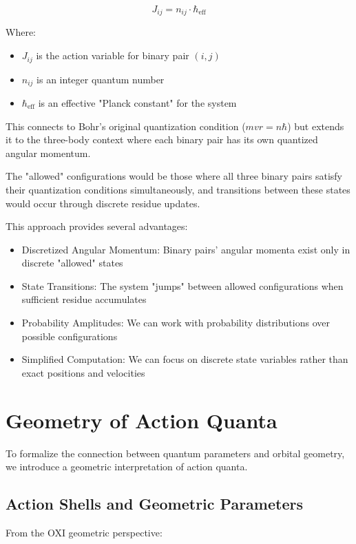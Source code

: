 \documentclass{article}
\begin{document}
\begin{equation}
J_{ij} = n_{ij} \cdot \hbar_{\text{eff}}
\end{equation}

Where:
\begin{itemize}
\item $J_{ij}$ is the action variable for binary pair $(i,j)$
\item $n_{ij}$ is an integer quantum number
\item $\hbar_{\text{eff}}$ is an effective "Planck constant" for the system
\end{itemize}

This connects to Bohr's original quantization condition ($mvr = n\hbar$) but extends it to the three-body context where each binary pair has its own quantized angular momentum.

The "allowed" configurations would be those where all three binary pairs satisfy their quantization conditions simultaneously, and transitions between these states would occur through discrete residue updates.

This approach provides several advantages:
\begin{itemize}
\item Discretized Angular Momentum: Binary pairs' angular momenta exist only in discrete "allowed" states
\item State Transitions: The system "jumps" between allowed configurations when sufficient residue accumulates
\item Probability Amplitudes: We can work with probability distributions over possible configurations
\item Simplified Computation: We can focus on discrete state variables rather than exact positions and velocities
\end{itemize}

\section{Geometry of Action Quanta}

To formalize the connection between quantum parameters and orbital geometry, we introduce a geometric interpretation of action quanta.

\subsection{Action Shells and Geometric Parameters}

From the OXI geometric perspective:
\end{document}
